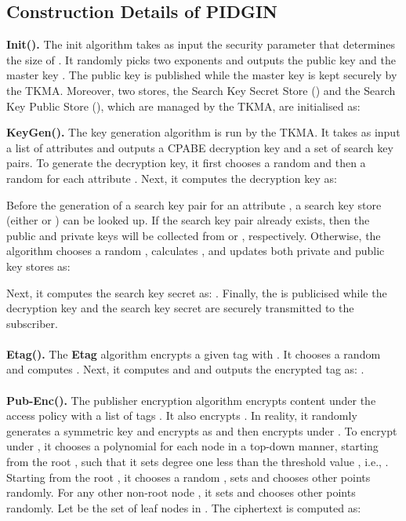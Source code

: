 \documentclass[epsfig,a4paper,11pt,titlepage]{book}
\numberwithin{algorithm}{chapter}
\begin{document}
\subsection[Construction Details of PIDGIN]{Construction Details of \gls{PIDGIN}}
\noindent \textbf{Init().} The init algorithm takes as input the security parameter  that determines the size of . 
It randomly picks two exponents  and outputs the public key  and the master key . 
The public key  is published while the master key  is kept securely by the \gls{TKMA}. 
Moreover, two stores, the Search Key Secret Store () and the Search Key Public Store (), which are managed by the \gls{TKMA}, are initialised as:

\textbf{KeyGen().} The key generation algorithm is run by the \gls{TKMA}. 
It takes as input a list of attributes  and outputs a \gls{CPABE} decryption key and a set of search key pairs. 
To generate the decryption key, it first chooses a random  and then a random  for each attribute . Next, it computes the decryption key as: 


Before the generation of a search key pair for an attribute , a search key store (either  or ) can be looked up. If the search key pair already exists, then the public and private keys will be collected from  or , respectively. Otherwise, the algorithm chooses a random , calculates , and updates both private and public key stores as:

Next, it computes the search key secret as: . Finally, the  is publicised while the decryption key  and the search key secret  are securely transmitted to the subscriber. \\ \\
\textbf{Etag().} The \textbf{Etag} algorithm encrypts a given tag  with . It chooses a random  and computes . 
Next, it computes  and  and outputs the encrypted tag as: . \\ \\
\textbf{Pub-Enc().} The publisher encryption algorithm encrypts content  under the access policy  with a list of tags . It also encrypts . In reality, it randomly generates a symmetric key  and encrypts  as  and then encrypts  under . To encrypt  under , it chooses a polynomial  for each node  in a top-down manner, starting from the root , such that it sets degree  one less than the threshold value , i.e., . Starting from the root , it chooses a random , sets  and chooses other  points randomly. For any other non-root node , it sets  and chooses other  points randomly. Let  be the set of leaf nodes in . 
The ciphertext is computed as: 
\end{document}
